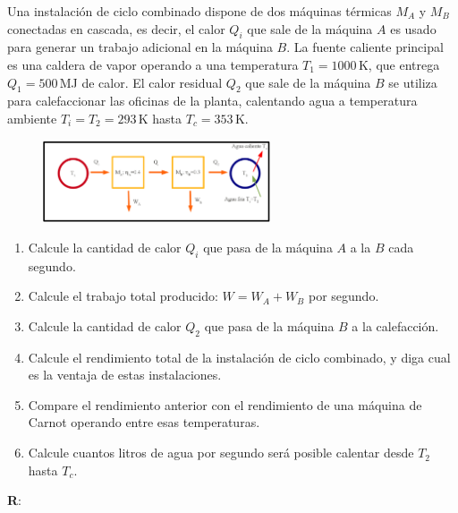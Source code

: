 \documentclass[a4paper,12pt]{article}
\begin{document}
\begin{enumerate}
		Una instalación de ciclo combinado dispone de dos máquinas térmicas
		$M_A$ y $M_B$ conectadas en cascada, es decir, el calor $Q_i$ que sale
		de la máquina $A$ es usado para generar un trabajo adicional en la
		máquina $B$.  La fuente caliente principal es una caldera de vapor
		operando a una temperatura $T_1=1000$\,K, que entrega $Q_1=500$\,MJ de
		calor. El calor residual $Q_2$ que sale de la máquina $B$ se utiliza
		para calefaccionar las oficinas de la planta, calentando agua a
		temperatura ambiente $T_i=T_2=293$\,K hasta $T_c=353$\,K.
		\begin{figure}[hhhhhb!]
			\centering
			\includegraphics[width=0.6\textwidth]{maq2}
		\end{figure}
		\begin{enumerate}
			\item Calcule la cantidad de calor $Q_i$ que pasa de la máquina $A$
				a la $B$ cada segundo.
			\item Calcule el trabajo total producido:
					$W=W_A+W_B$ por segundo.
			\item Calcule la cantidad de calor $Q_2$ que pasa de la máquina $B$
				a la calefacción.
			\item Calcule el rendimiento total de la instalación de ciclo
				combinado, y diga cual es la ventaja de estas instalaciones.
			\item Compare el rendimiento anterior con el rendimiento de una
				máquina de Carnot operando entre esas temperaturas.
			\item Calcule cuantos litros de agua por segundo será posible
				calentar desde $T_2$ hasta $T_c$.
		\end{enumerate}
		{\bf{R}}: 
\end{enumerate}
\end{document}
